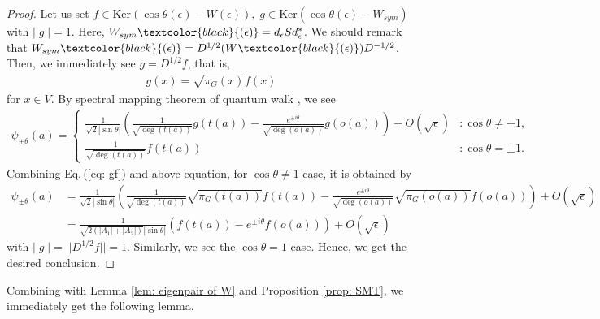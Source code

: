 \documentclass[12pt]{article}
\numberwithin{lemma}{section}
\numberwithin{proposition}{section}
\numberwithin{remark}{section}
\numberwithin{definition}{section}
\newcommand{\red}{\textcolor{black}}
\begin{document}
\begin{proof}
    Let us set $f \in \mathrm{Ker}(\cos\theta (\epsilon)-W(\epsilon)),\; g \in \mathrm{Ker}(\cos \theta (\epsilon)-W_{sym})$ with $||g||=1$. Here, $W_{sym}\red{(\epsilon)}=d_{\epsilon}Sd_{\epsilon}^{*}$.
    We should remark that $W_{sym}\red{(\epsilon)}=D^{1/2}(W\red{(\epsilon)})D^{-1/2}$. Then, we immediately see $g=D^{1/2}f$, that is, 
    \begin{align}
        \label{eq: gf}
        g(x)= \sqrt{\pi_{G}(x)}f(x)
    \end{align}
    for $x \in V$.
    By spectral mapping theorem of quantum walk \cite{HKSS}, we see
    \begin{align*}
        \psi_{\pm \theta}(a)=
        \begin{cases}
            \displaystyle\frac{1}{\sqrt{2}|\sin \theta|}\left(\frac{1}{\sqrt{\deg (t(a))}}g(t(a))- \frac{e^{\pm i \theta}}{\sqrt{\deg (o(a))}}g(o(a))\right)+O(\sqrt{\epsilon}) &: \cos \theta \neq \pm 1, \\
            \displaystyle\frac{1}{\sqrt{\deg (t(a))}}f(t(a)) &: \cos \theta=\pm 1.
        \end{cases}
    \end{align*}
    Combining Eq.\,(\ref{eq: gf}) and above equation, for $\cos \theta \neq 1$ case, it is obtained by
    \begin{align*}
        \psi_{\pm \theta}(a)&=\displaystyle\frac{1}{\sqrt{2}|\sin \theta|}\left(\frac{1}{\sqrt{\deg (t(a))}}\sqrt{\pi_{G}(t(a))}f(t(a))- \frac{e^{\pm i \theta}}{\sqrt{\deg (o(a))}}\sqrt{\pi_{G}(o(a))}f(o(a))\right)+O(\sqrt{\epsilon}) \\
        &=\displaystyle\frac{1}{\sqrt{2(|A_{1}|+|A_{2}|)}|\sin \theta|}\left(f(t(a))-e^{\pm i \theta}f(o(a))\right)+O(\sqrt{\epsilon})
    \end{align*}
    with $||g||=||D^{1/2}f||=1$. Similarly, we see the $\cos \theta= 1$ case.
    Hence, we get the desired conclusion.
\end{proof}
Combining with Lemma \ref{lem: eigenpair of W} and Proposition \ref{prop: SMT}, we immediately get the following lemma.
\end{document}
